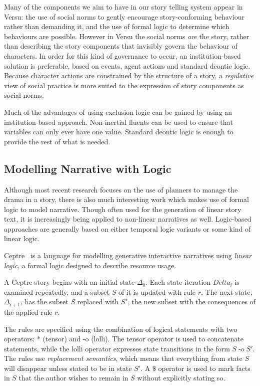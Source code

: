 Many of the components we aim to have in our story telling system appear in Versu: the use of social norms to gently encourage story-conforming behaviour rather than demanding it, and the use of formal logic to determine which behaviours are possible. However in Versu the social norms \emph{are} the story, rather than describing the story components that invisibly govern the behaviour of characters. In order for this kind of governance to occur, an institution-based solution is preferable, based on events, agent actions and standard deontic logic. Because character actions are constrained by the structure of a story, a \emph{regulative}  view of social practice is more suited to the expression of story components as social norms.

Much of the advantages of using exclusion logic can be gained by using an institution-based approach. Non-inertial fluents can be used to ensure that variables can only ever have one value. Standard deontic logic is enough to provide the rest of what is needed.

\subsection{Modelling Narrative with Logic}
\label{sec:model-logic}
Although most recent research focuses on the use of planners to manage the drama in a story, there is also much interesting work which makes use of formal logic to model narrative. Though often used for the generation of linear story text, it is increasingly being applied to non-linear narratives as well. Logic-based approaches are generally based on either temporal logic variants or some kind of linear logic.

Ceptre~\citep{martens2015ceptre} is a language for modelling generative interactive narratives using \emph{linear logic}, a formal logic designed to describe resource usage. 

A Ceptre story begins with an initial state $\Delta_0$. Each state iteration
$Delta_i$ is examined repeatedly, and a subset $S$ of it is updated with rule
$r$. The next state, $\Delta_{i+1}$, has the subset $S$ replaced with $S'$, the
new subset with the consequences of the applied rule $r$.

The rules are specified using the combination of logical statements with two
operators: $*$ (tensor) and $\text{-o}$ (lolli). The tensor operator is used to
concatenate statements, while the lolli operator expresses state transitions in
the form $S \mathrel{\text{-o}} S'$. The rules use \emph{replacement semantics},
which means that everything from state $S$ will disappear unless stated to be in
state $S'$. A $\$$ operator is used to mark facts in $S$ that the author wishes
to remain in $S$ without explicitly stating so.

